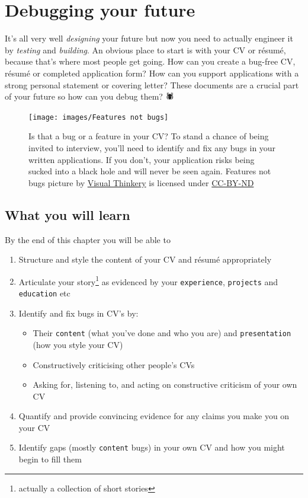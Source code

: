 \documentclass[
]{book}
\providecommand{\tightlist}{%
  \setlength{\itemsep}{0pt}\setlength{\parskip}{0pt}}
\begin{document}
\hypertarget{debugging}{%
\chapter{Debugging your future}\label{debugging}}

It's all very well \emph{designing} your future but now you need to actually engineer it by \emph{testing} and \emph{building}. An obvious place to start is with your CV or résumé, because that's where most people get going. How can you create a bug-free CV, résumé or completed application form? How can you support applications with a strong personal statement or covering letter? These documents are a crucial part of your future so how can you debug them? 🕷

\begin{figure}

{\centering \texttt{[image: images/Features not bugs]} 

}

\caption{Is that a bug or a feature in your CV? To stand a chance of being invited to interview, you'll need to identify and fix any bugs in your written applications. If you don't, your application risks being sucked into a black hole and will never be seen again. Features not bugs picture by \href{https://visualthinkery.com}{Visual Thinkery} is licensed under \href{https://creativecommons.org/licenses/by-nd/4.0/}{CC-BY-ND}}\label{fig:bugfeature-fig}
\end{figure}



\hypertarget{ilo7}{%
\section{What you will learn}\label{ilo7}}

By the end of this chapter you will be able to

\begin{enumerate}
\def\labelenumi{\arabic{enumi}.}
\tightlist
\item
  Structure and style the content of your CV and résumé appropriately
\item
  Articulate your story\footnote{actually a collection of short stories} as evidenced by your \texttt{experience}, \texttt{projects} and \texttt{education} etc
\item
  Identify and fix bugs in CV's by:

  \begin{itemize}
  \tightlist
  \item
    Their \texttt{content} (what you've done and who you are) and \texttt{presentation} (how you style your CV)
  \item
    Constructively criticising other people's CVs
  \item
    Asking for, listening to, and acting on constructive criticism of your own CV
  \end{itemize}
\item
  Quantify and provide convincing evidence for any claims you make you on your CV
\item
  Identify gaps (mostly \texttt{content} bugs) in your own CV and how you might begin to fill them
\end{enumerate}
\end{document}
